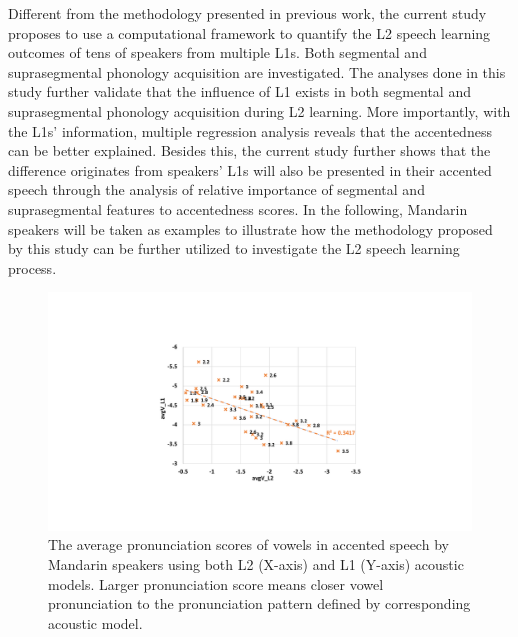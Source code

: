 Different from the methodology presented in previous work, the current study proposes to use a computational framework to quantify the L2 speech learning outcomes of tens of speakers from multiple L1s. Both segmental and suprasegmental phonology acquisition are investigated. The analyses done in this study further validate that the influence of L1 exists in both segmental and suprasegmental phonology acquisition during L2 learning. More importantly, with the L1s' information, multiple regression analysis reveals that the accentedness can be better explained. Besides this, the current study further shows that the difference originates from speakers' L1s will also be presented in their accented speech through the analysis of relative importance of segmental and suprasegmental features to accentedness scores. In the following, Mandarin speakers will be taken as examples to illustrate how the methodology proposed by this study can be further utilized to investigate the L2 speech learning process.

\begin{figure}[t]
        \begin{minipage}[t]{1.0\linewidth}
        \centering
            \includegraphics[width=5.0in]{figures/ch7_seg.pdf}
        \end{minipage}%
        \caption{The average pronunciation scores of vowels in accented speech by Mandarin speakers using both L2 (X-axis) and L1 (Y-axis) acoustic models. Larger pronunciation score means closer vowel pronunciation to the pronunciation pattern defined by corresponding acoustic model.}
        \centering
        \label{fig:ch7_seg}
     \end{figure}

